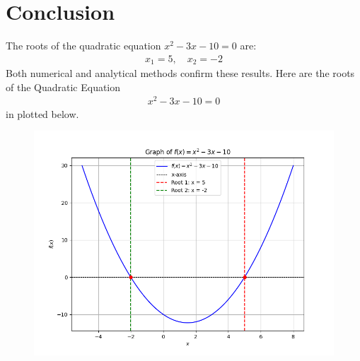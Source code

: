 \documentclass[journal]{IEEEtran}
\begin{document}
\section*{Conclusion}
The roots of the quadratic equation \( x^2 - 3x - 10 = 0 \) are:
\begin{align}
    x_1 = 5, \quad x_2 = -2
\end{align}
Both numerical and analytical methods confirm these results.
Here are the roots of the Quadratic Equation 
\begin{align}
    x^2 - 3x - 10 = 0
\end{align} in plotted below.\\

\begin{figure}[h!]
   \centering
   \includegraphics[width=0.7\columnwidth]{figs/fig.png}
\end{figure}
\end{document}
